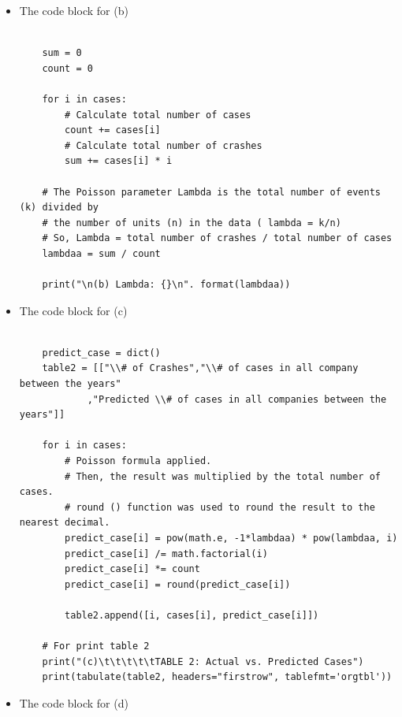 \documentclass[a4 paper]{article}
\numberwithin{equation}{section}
\newcommand{\0}{\mathbf{0}}
\begin{document}
\begin{itemize}
	\item The code block for (b)\\
	
		\begin{lstlisting}[label={list:first},caption=The code block b - Compute Lambda]
	
	sum = 0
	count = 0

	for i in cases:
		# Calculate total number of cases
		count += cases[i]
		# Calculate total number of crashes
		sum += cases[i] * i

	# The Poisson parameter Lambda is the total number of events (k) divided by
	# the number of units (n) in the data ( lambda = k/n)
	# So, Lambda = total number of crashes / total number of cases
	lambdaa = sum / count

	print("\n(b) Lambda: {}\n". format(lambdaa))
\end{lstlisting}
	
	\item The code block for (c)\\
	
		\begin{lstlisting}[label={list:first},caption=The code block c - Compute the values in Table 2 and Print table]

	predict_case = dict()
	table2 = [["\\# of Crashes","\\# of cases in all company between the years"
			,"Predicted \\# of cases in all companies between the years"]]

	for i in cases:
		# Poisson formula applied.
		# Then, the result was multiplied by the total number of cases.
		# round () function was used to round the result to the nearest decimal.
		predict_case[i] = pow(math.e, -1*lambdaa) * pow(lambdaa, i)
		predict_case[i] /= math.factorial(i)
		predict_case[i] *= count
		predict_case[i] = round(predict_case[i])

		table2.append([i, cases[i], predict_case[i]])

	# For print table 2
	print("(c)\t\t\t\t\tTABLE 2: Actual vs. Predicted Cases")
	print(tabulate(table2, headers="firstrow", tablefmt='orgtbl'))
\end{lstlisting}
	
	\item The code block for (d)\\
	
		\begin{lstlisting}[label={list:first},caption=The code block d - Draw the barplot]


\end{lstlisting}
\end{itemize}
\end{document}
